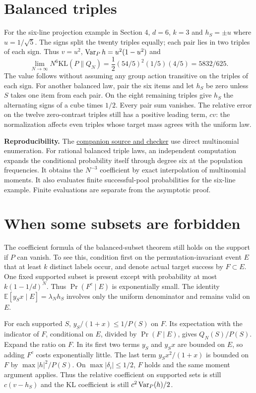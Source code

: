 \documentclass[11pt]{article}
\begin{document}
\newpage
\section{Balanced triples}
For the six-line projection example in Section 4, $d=6$, $k=3$ and $h_S=\pm u$ where $u=1/\sqrt5$. The signs split the twenty triples equally; each pair lies in two triples of each sign. Thus $v=u^2$, $\operatorname{Var}_P h=u^2(1-u^2)$ and
\[
               \lim_{N\to\infty}N^6\mathrm{KL}(P\|Q_N)
               =\frac12(54/5)^2(1/5)(4/5)=5832/625.
\]
The value follows without assuming any group action transitive on the triples of each sign. For another balanced law, pair the six items and let $h_S$ be zero unless $S$ takes one item from each pair. On the eight remaining triples give $h_S$ the alternating signs of a cube times $1/2$. Every pair sum vanishes. The relative error on the twelve zero-contrast triples still has a positive leading term, $cv$: the normalization affects even triples whose target mass agrees with the uniform law.

\textbf{Reproducibility.} The \href{https://github.com/lluiseriksson/THE-ERIKSSON-PROGRAMME/tree/codex/pool-bias-20261120/audits/pool-dpp}{companion source and checker} use direct multinomial enumeration. For rational balanced triple laws, an independent computation expands the conditional probability itself through degree six at the population frequencies. It obtains the $N^{-3}$ coefficient by exact interpolation of multinomial moments. It also evaluates finite successful-pool probabilities for the six-line example. Finite evaluations are separate from the asymptotic proof.


\newpage
\section{When some subsets are forbidden}
The coefficient formula of the balanced-subset theorem still holds on the support if $P$ can vanish. To see this, condition first on the permutation-invariant event $E$ that at least $k$ distinct labels occur, and denote actual target success by $F\subset E$. One fixed supported subset is present except with probability at most $k(1-1/d)^N$. Thus $\Pr(F^c\mid E)$ is exponentially small. The identity $\mathbb E[y_Sx\mid E]=\lambda_N h_S$ involves only the uniform denominator and remains valid on $E$.

For each supported $S$, $y_S/(1+x)\le 1/P(S)$ on $F$. Its expectation with the indicator of $F$, conditional on $E$, divided by $\Pr(F\mid E)$, gives $Q_N(S)/P(S)$. Expand the ratio on $F$. In its first two terms $y_S$ and $y_Sx$ are bounded on $E$, so adding $F^c$ costs exponentially little. The last term $y_S x^2/(1+x)$ is bounded on $F$ by $\max|h|^2/P(S)$. On $\max|\delta_i|\le1/2$, $F$ holds and the same moment argument applies. Thus the relative coefficient on supported sets is still $c(v-h_S)$ and the KL coefficient is still $c^2\operatorname{Var}_P(h)/2$.
\end{document}
